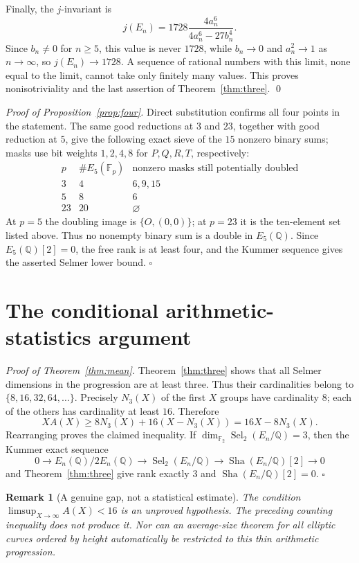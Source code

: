 \documentclass[11pt]{article}
\newtheorem{remark}[theorem]{Remark}
\newcommand{\Q}{\mathbb Q}
\newcommand{\F}{\mathbb F}
\newcommand{\Sel}{\operatorname{Sel}}
\newcommand{\Sha}{\mathop{\mathrm{Sha}}}
\begin{document}
Finally, the $j$-invariant is
\[
 j(E_n)=1728\frac{4a_n^6}{4a_n^6-27b_n^4}.
\]
Since $b_n\ne0$ for $n\ge5$, this value is never $1728$,
while $b_n\to0$ and $a_n^2\to1$ as $n\to\infty$,
so $j(E_n)\to1728$. A sequence of rational numbers with this
limit, none equal to the limit, cannot take only finitely many
values. This proves nonisotriviality and the last assertion of
Theorem~\ref{thm:three}. \qed

\medskip
\noindent\emph{Proof of Proposition~\ref{prop:four}.}
Direct substitution confirms all four points in the statement.
The same good reductions at $3$ and $23$, together with good
reduction at $5$, give the following exact sieve of the $15$
nonzero binary sums; masks use bit weights $1,2,4,8$ for
$P,Q,R,T$, respectively:
\[
\begin{array}{c|c|l}
p & \#E_5(\F_p) & \text{nonzero masks still potentially doubled}\\ \hline
3 &4 & 6,9,15\\
5 &8 &6\\
23&20&\varnothing
\end{array}
\]
At $p=5$ the doubling image is $\{O,(0,0)\}$;
at $p=23$ it is the ten-element set listed above.
Thus no nonempty binary sum is a double in $E_5(\Q)$.
Since $E_5(\Q)[2]=0$, the free rank is at least four,
and the Kummer sequence gives the asserted Selmer lower bound.
\hfill$\square$

\section{The conditional arithmetic-statistics argument}

\noindent\emph{Proof of Theorem~\ref{thm:mean}.}
Theorem~\ref{thm:three} shows that all Selmer dimensions
in the progression are at least three. Thus their cardinalities
belong to $\{8,16,32,64,\ldots\}$. Precisely $N_3(X)$ of
the first $X$ groups have cardinality $8$; each of the
others has cardinality at least $16$. Therefore
\[
 XA(X)\ge 8N_3(X)+16(X-N_3(X))
       =16X-8N_3(X).
\]
Rearranging proves the claimed inequality.
If $\dim_{\F_2}\Sel_2(E_n/\Q)=3$, then the Kummer
exact sequence
\[
0\longrightarrow E_n(\Q)/2E_n(\Q)
\longrightarrow\Sel_2(E_n/\Q)
\longrightarrow\Sha(E_n/\Q)[2]\longrightarrow0
\]
and Theorem~\ref{thm:three} give rank exactly $3$
and $\Sha(E_n/\Q)[2]=0$. \hfill$\square$

\begin{remark}[A genuine gap, not a statistical estimate]
The condition $\limsup_{X\to\infty}A(X)<16$ is an
unproved hypothesis. The preceding counting inequality
does not produce it. Nor can an average-size theorem
for all elliptic curves ordered by height automatically
be restricted to this thin arithmetic progression.
\end{remark}
\end{document}
